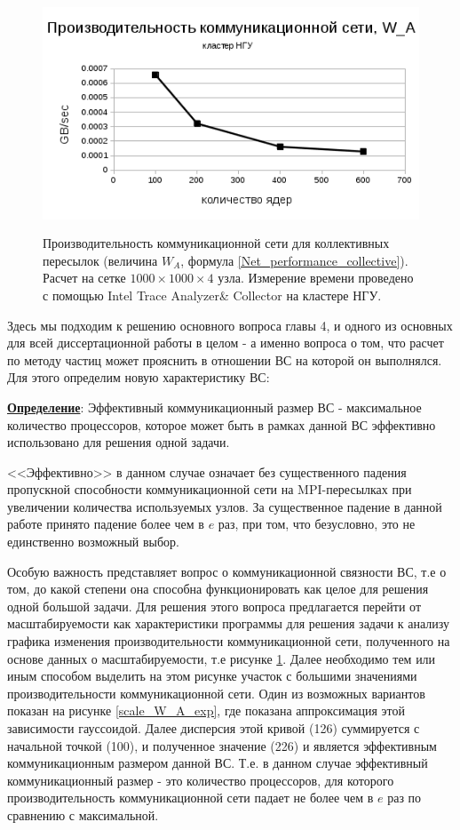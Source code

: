 \begin{figure}[h]
	
	
	\begin{center}
		\includegraphics[height=7cm,keepaspectratio]{images/scaleNSU_W_A_new.png}
		\caption{
		 Производительность коммуникационной сети для коллективных пересылок (величина $W_A$, формула \ref{Net_performance_collective}). Расчет на сетке $1000 \times 1000 \times 4$ узла. Измерение времени проведено с помощью Intel Trace Analyzer\& Collector на кластере НГУ.
		}
		\label{scale_W_A}
	\end{center} 
\end{figure}
     Здесь мы подходим к решению основного вопроса главы 4, и одного из основных для всей диссертационной работы в целом - а именно вопроса о том, что расчет по методу частиц может прояснить в отношении ВС на которой он выполнялся. Для этого определим новую характеристику ВС:
     
     \underline{\textbf{Определение}}: Эффективный коммуникационный размер ВС - максимальное количество процессоров, которое может быть в рамках данной ВС эффективно использовано для решения одной задачи.  
     
     <<Эффективно>> в данном случае означает без существенного падения пропускной способности коммуникационной сети на MPI-пересылках при увеличении количества используемых узлов. За существенное падение в данной работе принято падение более чем в $e$ раз, при том, что безусловно, это не единственно возможный выбор. 
     
     Особую важность представляет вопрос о коммуникационной связности ВС, т.е о том, до какой степени она способна функционировать как целое для решения одной большой задачи. Для решения этого вопроса предлагается перейти от масштабируемости как характеристики программы для решения задачи к анализу графика изменения производительности коммуникационной сети, полученного на основе данных о масштабируемости, т.е рисунке \ref{scale_W_A}. Далее необходимо тем или иным способом выделить на этом рисунке участок с большими значениями производительности коммуникационной сети.
     Один из возможных вариантов показан на рисунке \ref{scale_W_A_exp}, где показана аппроксимация этой зависимости гауссоидой. Далее дисперсия этой кривой (126) суммируется с начальной точкой (100), и полученное значение (226) и является эффективным коммуникационным размером данной ВС. Т.е. в данном случае эффективный коммуникационный размер - это количество процессоров, для которого производительность коммуникационной сети падает не более чем в $e$ раз по сравнению с максимальной.
     
